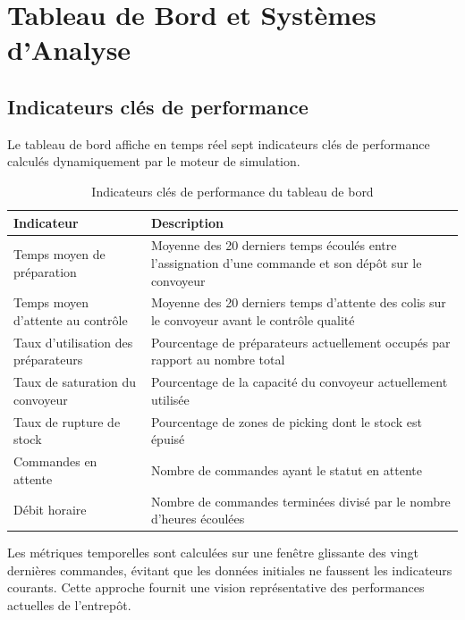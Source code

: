 \documentclass[12pt,a4paper]{report}
\begin{document}
\chapter{Tableau de Bord et Syst\`emes d'Analyse}

\section{Indicateurs cl\'es de performance}

Le tableau de bord affiche en temps r\'eel sept indicateurs cl\'es de performance calcul\'es dynamiquement par le moteur de simulation.

\begin{table}[H]
\centering
\caption{Indicateurs cl\'es de performance du tableau de bord}
\label{tab:kpis}
\begin{tabularx}{\textwidth}{|l|X|}
\hline
\textbf{Indicateur} & \textbf{Description} \\
\hline
Temps moyen de pr\'eparation & Moyenne des 20 derniers temps \'ecoul\'es entre l'assignation d'une commande et son d\'ep\^ot sur le convoyeur \\
\hline
Temps moyen d'attente au contr\^ole & Moyenne des 20 derniers temps d'attente des colis sur le convoyeur avant le contr\^ole qualit\'e \\
\hline
Taux d'utilisation des pr\'eparateurs & Pourcentage de pr\'eparateurs actuellement occup\'es par rapport au nombre total \\
\hline
Taux de saturation du convoyeur & Pourcentage de la capacit\'e du convoyeur actuellement utilis\'ee \\
\hline
Taux de rupture de stock & Pourcentage de zones de picking dont le stock est \'epuis\'e \\
\hline
Commandes en attente & Nombre de commandes ayant le statut en attente \\
\hline
D\'ebit horaire & Nombre de commandes termin\'ees divis\'e par le nombre d'heures \'ecoul\'ees \\
\hline
\end{tabularx}
\end{table}

Les m\'etriques temporelles sont calcul\'ees sur une fen\^etre glissante des vingt derni\`eres commandes, \'evitant que les donn\'ees initiales ne faussent les indicateurs courants. Cette approche fournit une vision repr\'esentative des performances actuelles de l'entrep\^ot.
\end{document}

